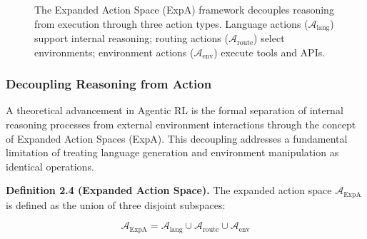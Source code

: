 \begin{figure}[tbp]
    \caption{The Expanded Action Space (ExpA) framework decouples reasoning from execution through three action types. Language actions ($\mathcal{A}_{\text{lang}}$) support internal reasoning; routing actions ($\mathcal{A}_{\text{route}}$) select environments; environment actions ($\mathcal{A}_{\text{env}}$) execute tools and APIs.}
    \label{fig:expa}
\end{figure}



\subsubsection{Decoupling Reasoning from Action}

A theoretical advancement in Agentic RL is the formal separation of internal reasoning processes from external environment interactions through the concept of Expanded Action Spaces (ExpA). This decoupling addresses a fundamental limitation of treating language generation and environment manipulation as identical operations.

\textbf{Definition 2.4 (Expanded Action Space).} The expanded action space $\mathcal{A}_{\text{ExpA}}$ is defined as the union of three disjoint subspaces:

$$\mathcal{A}_{\text{ExpA}} = \mathcal{A}_{\text{lang}} \cup \mathcal{A}_{\text{route}} \cup \mathcal{A}_{\text{env}}$$

